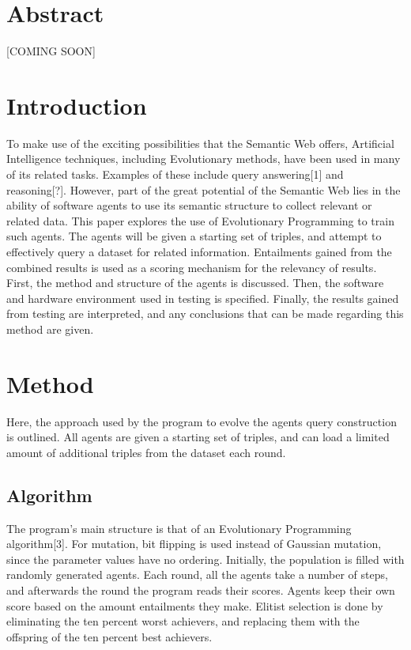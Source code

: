 \documentclass[thesis,12pt]{article}
\begin{document}
\section{Abstract}
[COMING SOON]

\section{Introduction}
To make use of the exciting possibilities that the Semantic Web offers, Artificial Intelligence techniques, including Evolutionary methods, have been used in many of its related tasks. Examples of these include query answering[1] and reasoning[?]. However, part of the great potential of the Semantic Web lies in the ability of software agents to use its semantic structure to collect relevant or related data. This paper explores the use of Evolutionary Programming to train such agents. The agents will be given a starting set of triples, and attempt to effectively query a dataset for related information. Entailments gained from the combined results is used as a scoring mechanism for the relevancy of results. 
First, the method and structure of the agents is discussed. Then, the software and hardware environment used in testing is specified. Finally, the results gained from testing are interpreted, and any conclusions that can be made regarding this method are given.

\section{Method}

Here, the approach used by the program to evolve the agents query construction is outlined. All agents are given a starting set of triples, and can load a limited amount of additional triples from the dataset each round. 

\subsection{Algorithm}
The program's main structure is that of an Evolutionary Programming algorithm[3]. For mutation, bit flipping is used instead of Gaussian mutation, since the parameter values have no ordering. Initially, the population is filled with randomly generated agents. Each round, all the agents take a number of steps, and afterwards the round the program reads their scores. Agents keep their own score based on the amount entailments they make. Elitist selection is done by eliminating the ten percent worst achievers, and replacing them with the offspring of the ten percent best achievers. 
\end{document}
